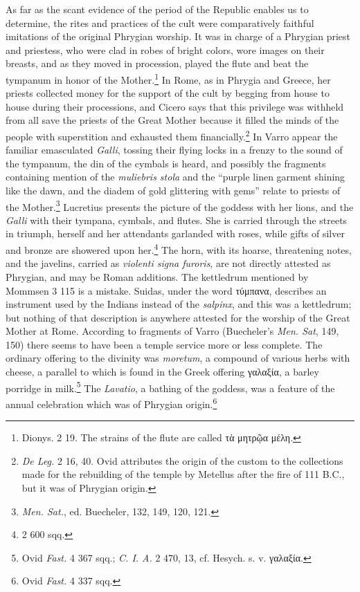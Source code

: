 \documentclass[a4paper, 11pt, oneside, polutonikogreek, english]{article}
\begin{document}
As far as the scant evidence of the period of the Republic enables us to determine, the rites and practices of the cult were comparatively faithful imitations of the original Phrygian worship. It was in charge of a Phrygian priest and priestess, who were clad in robes of bright colors, wore images on their breasts, and as they moved in procession, played the flute and beat the tympanum in honor of the Mother.\footnote{Dionys. 2 19. The strains of the flute are called τὰ μητρῷα μέλη.} In Rome, as in Phrygia and Greece, her priests collected money for the support of the cult by begging from house to house during their processions, and Cicero says that this privilege was withheld from all save the priests of the Great Mother because it filled the minds of the people with superstition and exhausted them financially.\footnote{\emph{De Leg.} 2 16, 40. Ovid attributes the origin of the custom to the collections made for the rebuilding of the temple by Metellus after the fire of 111 \textsc{B.C.}, but it was of Phrygian origin.} In Varro appear the familiar emasculated \emph{Galli}, tossing their flying locks in a frenzy to the sound of the tympanum, the din of the cymbals is heard, and possibly the fragments containing mention of the \emph{muliebris stola} and the ``purple linen garment shining like the dawn, and the diadem of gold glittering with gems'' relate to priests of the Mother.\footnote{\emph{Men. Sat.}, ed. Buecheler, 132, 149, 120, 121.} Lucretius presents the picture of the goddess with her lions, and the \emph{Galli} with their tympana, cymbals, and flutes. She is carried through the streets in triumph, herself and her attendants garlanded with roses, while gifts of silver and bronze are showered upon her.\footnote{2 600 sqq.} The horn, with its hoarse, threatening notes, and the javelins, carried as \emph{violenti signa furoris}, are not directly attested as Phrygian, and may be Roman additions. The kettledrum mentioned by Mommsen 3 115 is a mistake. Suidas, under the word τύμπανα, describes an instrument used by the Indians instead of the \emph{salpinx}, and this was a kettledrum; but nothing of that description is anywhere attested for the worship of the Great Mother at Rome. According to fragments of Varro (Buecheler's \emph{Men. Sat}, 149, 150) there seems to have been a temple service more or less complete. The ordinary offering to the divinity was \emph{moretum}, a compound of various herbs with cheese, a parallel to which is found in the Greek offering γαλαξία, a barley porridge in milk.\footnote{Ovid \emph{Fast.} 4 367 sqq.; \emph{C. I. A.} 2 470, 13, cf. Hesych. s. v. γαλαξία.} The \emph{Lavatio}, a bathing of the goddess, was a feature of the annual celebration which was of Phrygian origin.\footnote{Ovid \emph{Fast.} 4 337 sqq.}
\end{document}
